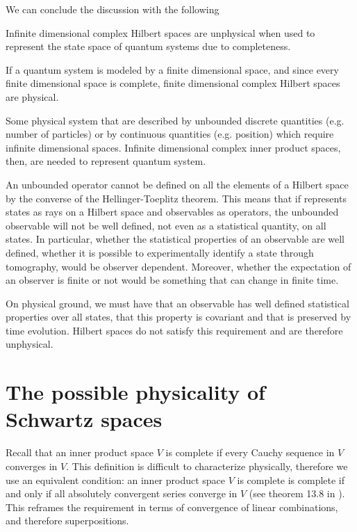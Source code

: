 \documentclass[10pt,twocolumn, nofootinbib]{revtex4-2}
\begin{document}
We can conclude the discussion with the following
\begin{prop}
	Infinite dimensional complex Hilbert spaces are unphysical when used to represent the state space of quantum systems due to completeness.
\end{prop}
\begin{justification}
	If a quantum system is modeled by a finite dimensional space, and since every finite dimensional space is complete, finite dimensional complex Hilbert spaces are physical.
	
	Some physical system that are described by unbounded discrete quantities (e.g. number of particles) or by continuous quantities (e.g. position) which require infinite dimensional spaces. Infinite dimensional complex inner product spaces, then, are needed to represent quantum system.

	An unbounded operator cannot be defined on all the elements of a Hilbert space by the converse of the Hellinger-Toeplitz theorem. This means that if represents states as rays on a Hilbert space and observables as operators, the unbounded observable will not be well defined, not even as a statistical quantity, on all states. In particular, whether the statistical properties of an observable are well defined, whether it is possible to experimentally identify a state through tomography, would be observer dependent. Moreover, whether the expectation of an observer is finite or not would be something that can change in finite time.
	
	On physical ground, we must have that an observable has well defined statistical properties over all states, that this property is covariant and that is preserved by time evolution. Hilbert spaces do not satisfy this requirement and are therefore unphysical.
\end{justification}

\section{The possible physicality of Schwartz spaces}

Recall that an inner product space $V$ is complete if every Cauchy sequence in $V$ converges in $V$. This definition is difficult to characterize physically, therefore we use an equivalent condition: an inner product space $V$ is complete is complete if and only if all absolutely convergent series converge in $V$ (see theorem 13.8 in \cite{roman_2008}). This reframes the requirement in terms of convergence of linear combinations, and therefore superpositions.
\end{document}
